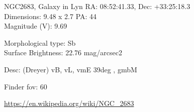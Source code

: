 \begin{block}{NGC2683, Galaxy in Lyn}
    RA: 08:52:41.33, Dec: +33:25:18.3 \\ 
    Dimensions: 9.48 x 2.7 PA: 44 \\ 
    Magnitude (V): 9.69

    Morphological type: Sb \\ 
    Surface Brightness: 22.76 mag/arcsec2 

    Desc: (Dreyer) vB, vL, vmE 39deg , gmbM 

    Finder fov: 60 

    \url{https://en.wikipedia.org/wiki/NGC_2683} 
\end{block}